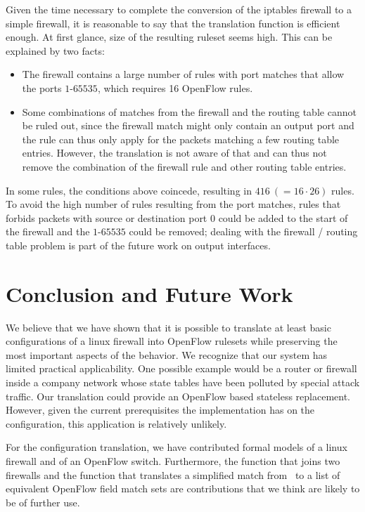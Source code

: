 Given the time necessary to complete the conversion of the iptables firewall to a simple firewall, it is reasonable to say that the translation function is efficient enough.
At first glance, size of the resulting ruleset seems high. 
This can be explained by two facts:
\begin{itemize}
	\item The firewall contains a large number of rules with port matches that allow the ports $1$-$65535$, which requires 16 OpenFlow rules.
	\item Some combinations of matches from the firewall and the routing table cannot be ruled out, since the firewall match might only contain an output port and the rule can thus only apply for the packets matching a few routing table entries. 
	However, the translation is not aware of that and can thus not remove the combination of the firewall rule and other routing table entries.
\end{itemize}
In some rules, the conditions above coincede, resulting in $416\ (=16 \cdot 26)$ rules.
To avoid the high number of rules resulting from the port matches, rules that forbids packets with source or destination port 0 could be added to the start of the firewall and the $1$-$65535$ could be removed;
dealing with the firewall / routing table problem is part of the future work on output interfaces.

\section{Conclusion and Future Work}
We believe that we have shown that it is possible to translate at least basic configurations of a linux firewall into OpenFlow rulesets while preserving the most important aspects of the behavior.
We recognize that our system has limited practical applicability.
One possible example would be a router or firewall inside a company network whose state tables have been polluted by special attack traffic.
Our translation could provide an OpenFlow based stateless replacement.
However, given the current prerequisites the implementation has on the configuration, this application is relatively unlikely.

For the configuration translation, we have contributed formal models of a linux firewall and of an OpenFlow switch.
Furthermore, the function that joins two firewalls and the function that translates a simplified match from~\cite{diekmann2016verified} to a list of equivalent OpenFlow field match sets are contributions that we think are likely to be of further use.


